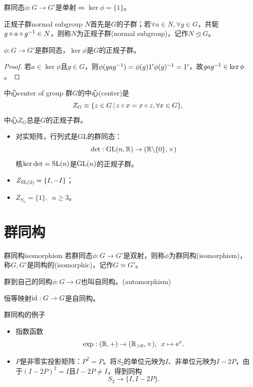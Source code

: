 \begin{corollary}
	群同态$\phi:G \to G'$是单射$\iff \ker\phi = \{1\}$。
\end{corollary}
\begin{definition}{正规子群}{normal subgroup}
	$N$首先是$G$的子群；若$\forall a \in N,\forall g \in G$，共轭$g \circ a \circ g^{-1} \in N$，则称$N$为正规子群(normal subgroup)，记作$N\trianglelefteq G$。
\end{definition}
\begin{theorem}{}{}
	$\phi:G \to G'$是群同态，$\ker\phi$是$G$的正规子群。
\end{theorem}
\begin{proof}
    若$a \in \ker\phi$且$g \in G$，则$\phi(gag^{-1}) = \phi(g)1'\phi(g)^{-1} = 1'$，故$gag^{-1} \in \ker\phi$。
\end{proof}
\begin{definition}{中心}{center of group}
	群$G$的中心(center)是
	\begin{equation}
		Z_G \equiv \{z \in G\,\vert\,z \circ x = x \circ z,\forall x \in G\},
	\end{equation}
	中心$Z_G$总是$G$的正规子群。
\end{definition}
\begin{example}{}{}
	\begin{itemize}
		\item 对实矩阵，行列式是GL的群同态：
		\[
			\det:\operatorname{GL}(n,\mathbb{R}) \to (\mathbb{R}\backslash\{0\}, \times)
		\]
		核$\ker\det = \operatorname{SL}(n)$是$\operatorname{GL}(n)$的正规子群。
		\item $Z_{\operatorname{SL}(2)} = \{I,-I\}$；
		\item $Z_{S_n} = \{1\},\enspace n \geq 3$。
	\end{itemize}
\end{example}

\section{群同构}

\begin{definition}{群同构}{isomorphism}
	若群同态$\phi:G \to G'$是双射，则称$\phi$为群同构(isomorphism)，称$G,G'$是同构的(isomorphic)，记作$G \simeq G'$。
	
	群到自己的同构$\phi:G \to G$也叫自同构。(automorphism)
\end{definition}
恒等映射$\operatorname{id}:G \to G$是自同构。
\begin{example}{群同构的例子}{}
	\begin{itemize}
		\item 指数函数
		\[
			\exp:(\mathbb{R},+) \to (\mathbb{R}_{>0}, \times),\enspace x \mapsto \mathop{}\!\mathrm{e}^x.
		\]
		\item $P$是非零实投影矩阵：$P^2 = P$。将$S_2$的单位元映为$I$、非单位元映为$I - 2P$，由于$(I - 2P)^2 = I$且$I - 2P \neq I$，得到同构
		\[
			S_2 \to \{I,I - 2P\}.
		\]
	\end{itemize}
\end{example}

